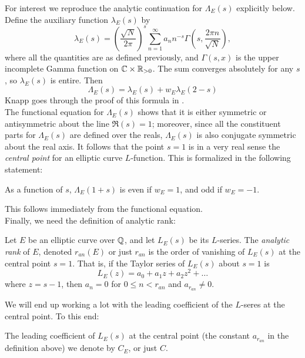 \documentclass[10pt]{article}
\newcommand{\Les}{L_E(s)}
\newcommand{\Lams}{\Lambda_E(s)}
\begin{document}
For interest we reproduce the analytic continuation for $\Lams$ explicitly below. Define the auxiliary function $\lambda_E(s)$ by
\begin{equation}
\lambda_E(s) = \left(\frac{\sqrt{N}}{2\pi}\right)^{s} \sum_{n=1}^\infty a_n n^{-s}\Gamma \left(s,\frac{2\pi n}{\sqrt{N}}\right),
\end{equation}
where all the quantities are as defined previously, and $\Gamma(s,x)$ is the upper incomplete Gamma function on $\mathbb{C}\times \mathbb{R}_{>0}$. The sum converges absolutely for any $s$, so $\lambda_E(s)$ is entire. Then
\begin{equation}
\Lambda_E(s) = \lambda_E(s) + w_E \lambda_E(2-s)
\end{equation}
Knapp goes through the proof of this formula in \cite[pp. 270-271]{Kna-1992}. \\

The functional equation for $\Lams$ shows that it is either symmetric or antisymmetric about the line $\Re(s) = 1$; moreover, since all the constituent parts for $\Lams$ are defined over the reals, $\Lams$ is also conjugate symmetric about the real axis. It follows that the point $s=1$ is in a very real sense the {\it central point} for an elliptic curve $L$-function. This is formalized in the following statement:
\begin{proposition}
As a function of $s$, $\Lambda_E(1+s)$ is even if $w_E=1$, and odd if $w_E = -1$.
\end{proposition}
This follows immediately from the functional equation. \\

Finally, we need the definition of analytic rank:
\begin{definition}
Let $E$ be an elliptic curve over $\mathbb{Q}$, and let $\Les$ be its $L$-series. The {\it analytic rank} of $E$, denoted $r_{an}(E)$ or just $r_{an}$ is the order of vanishing of $L_E(s)$ at the central point $s=1$. That is, if the Taylor series of $\Les$ about $s=1$ is
\begin{equation}
L_E(z) = a_0 + a_1 z + a_2 z^2 + \ldots
\end{equation}
where $z = s-1$, then $a_n = 0$ for $0 \le n < r_{an}$ and $a_{r_{an}} \ne 0$.
\end{definition}
We will end up working a lot with the leading coefficient of the $L$-seres at the central point. To this end:
\begin{definition}
The leading coefficient of $L_E(s)$ at the central point (the constant $a_{r_{an}}$ in the definition above) we denote by $C_E$, or just $C$.
\end{definition}
\end{document}
